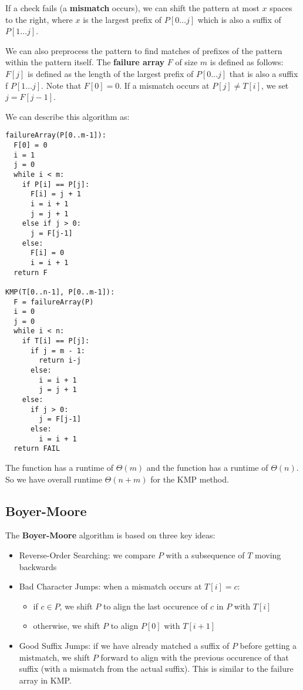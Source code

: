 \documentclass[12pt]{article}
\begin{document}
If a check fails (a {\bf mismatch} occurs), we can shift the pattern at most $x$ spaces to the right, where $x$ is the largest prefix of $P[0\dots j]$ which is also a suffix of $P[1\dots j]$.

We can also preprocess the pattern to find matches of prefixes of the pattern within the pattern itself. The {\bf failure array} $F$ of size $m$ is defined as follows: $F[j]$ is defined as the length of the largest prefix of $P[0\dots j]$ that is also a suffix f $P[1\dots j]$. Note that $F[0] = 0$. If a mismatch occurs at $P[j] \neq T[i]$, we set $j = F[j-1]$.

We can describe this algorithm as:
\begin{verbatim}
failureArray(P[0..m-1]):
  F[0] = 0
  i = 1
  j = 0
  while i < m:
    if P[i] == P[j]:
      F[i] = j + 1
      i = i + 1
      j = j + 1
    else if j > 0:
      j = F[j-1]
    else:
      F[i] = 0
      i = i + 1
  return F

KMP(T[0..n-1], P[0..m-1]):
  F = failureArray(P)
  i = 0
  j = 0
  while i < n:
    if T[i] == P[j]:
      if j = m - 1:
        return i-j
      else:
        i = i + 1
        j = j + 1
    else:
      if j > 0:
        j = F[j-1]
      else:
        i = i + 1
  return FAIL
\end{verbatim}

The  function has a runtime of $\Theta(m)$ and the  function has a runtime of $\Theta(n)$. So we have overall runtime $\Theta(n + m)$ for the KMP method.

\subsection{Boyer-Moore}
The {\bf Boyer-Moore} algorithm is based on three key ideas:
\begin{itemize}
\item Reverse-Order Searching: we compare $P$ with a subsequence of $T$ moving backwards
\item Bad Character Jumps: when a mismatch occurs at $T[i] = c$:
  \begin{itemize}
  \item if $c \in P$, we shift $P$ to align the last occurence of $c$ in $P$ with $T[i]$
  \item otherwise, we shift $P$ to align $P[0]$ with $T[i+1]$
  \end{itemize}
\item Good Suffix Jumps: if we have already matched a suffix of $P$ before getting a mistmatch, we shift $P$ forward to align with the previous occurence of that suffix (with a mismatch from the actual suffix). This is similar to the failure array in KMP.\@
\end{itemize}
\end{document}
